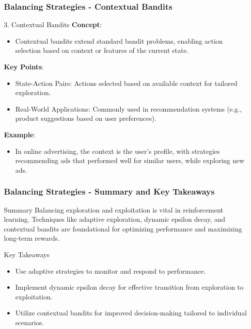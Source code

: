 \documentclass[aspectratio=169]{beamer}
\begin{document}
\begin{frame}[fragile]
    \frametitle{Balancing Strategies - Contextual Bandits}
    \begin{block}{3. Contextual Bandits}
        \textbf{Concept}:
        \begin{itemize}
            \item Contextual bandits extend standard bandit problems, enabling 
            action selection based on context or features of the current state.
        \end{itemize}

        \textbf{Key Points}:
        \begin{itemize}
            \item State-Action Pairs: Actions selected based on available context for tailored exploration.
            \item Real-World Applications: Commonly used in recommendation systems (e.g., 
            product suggestions based on user preferences).
        \end{itemize}

        \textbf{Example}:
        \begin{itemize}
            \item In online advertising, the context is the user's profile, 
            with strategies recommending ads that performed well for similar users, while exploring new ads.
        \end{itemize}
    \end{block}
\end{frame}

\begin{frame}[fragile]
    \frametitle{Balancing Strategies - Summary and Key Takeaways}
    \begin{block}{Summary}
        Balancing exploration and exploitation is vital in reinforcement learning. 
        Techniques like adaptive exploration, dynamic epsilon decay, and 
        contextual bandits are foundational for optimizing performance and maximizing long-term rewards. 
    \end{block}

    \begin{block}{Key Takeaways}
        \begin{itemize}
            \item Use adaptive strategies to monitor and respond to performance.
            \item Implement dynamic epsilon decay for effective transition from exploration to 
            exploitation.
            \item Utilize contextual bandits for improved decision-making tailored to individual scenarios.
        \end{itemize}
    \end{block}
\end{frame}
\end{document}
